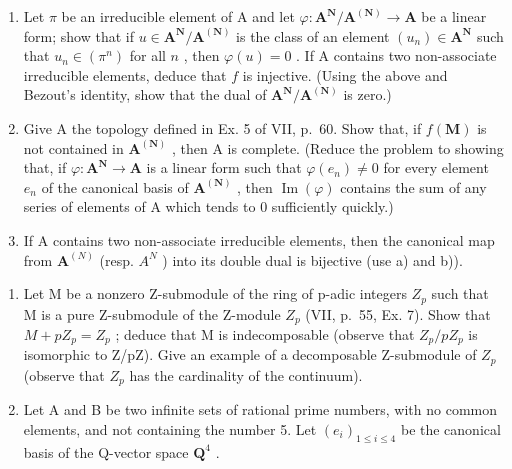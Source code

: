 \begin{enumerate}
\def\labelenumi{\alph{enumi})}
\item
  Let \(\pi\) be an irreducible element of A and let \(\varphi: \mathbf{A}^{\mathbf{N}} / \mathbf{A}^{(\mathbf{N})} \to \mathbf{A}\) be a linear form; show that if \(u \in \mathbf{A}^{\mathbf{N}} / \mathbf{A}^{(\mathbf{N})}\) is the class of an element \((u_n) \in \mathbf{A}^{\mathbf{N}}\) such that \(u_n \in (\pi^n)\) for all \(n\) , then \(\varphi(u) = 0\) . If A contains two non-associate irreducible elements, deduce that \(f\) is injective. (Using the above and Bezout's identity, show that the dual of \(\mathbf{A}^{\mathbf{N}} / \mathbf{A}^{(\mathbf{N})}\) is zero.)
\item
  Give A the topology defined in Ex. 5 of VII, p.~60. Show that, if \(f(\mathbf{M})\) is not contained in \(\mathbf{A}^{(\mathbf{N})}\) , then A is complete. (Reduce the problem to showing that, if \(\varphi : \mathbf{A}^{\mathbf{N}} \to \mathbf{A}\) is a linear form such that \(\varphi(e_n) \neq 0\) for every element \(e_n\) of the canonical basis of \(\mathbf{A}^{(\mathbf{N})}\) , then \(\operatorname{Im}(\varphi)\) contains the sum of any series of elements of A which tends to 0 sufficiently quickly.)
\item
  If A contains two non-associate irreducible elements, then the canonical map from \(\mathbf{A}^{(N)}\) (resp. \(A^{N}\) ) into its double dual is bijective (use a) and b)).
\end{enumerate}

\begin{enumerate}
\def\labelenumi{\arabic{enumi})}
\setcounter{enumi}{9}
\item
  Let M be a nonzero Z-submodule of the ring of p-adic integers \(Z_{p}\) such that M is a pure Z-submodule of the Z-module \(Z_{p}\) (VII, p.~55, Ex. 7). Show that \(M + pZ_{p} = Z_{p}\) ; deduce that M is indecomposable (observe that \(Z_{p}/pZ_{p}\) is isomorphic to Z/pZ). Give an example of a decomposable Z-submodule of \(Z_{p}\) (observe that \(Z_{p}\) has the cardinality of the continuum).
\item
  Let A and B be two infinite sets of rational prime numbers, with no common elements, and not containing the number 5. Let \((e_i)_{1 \leqslant i \leqslant 4}\) be the canonical basis of the Q-vector space \(\mathbf{Q}^4\) .
\end{enumerate}


